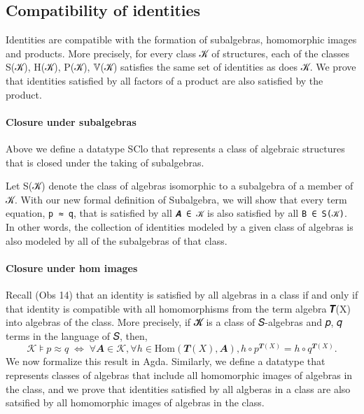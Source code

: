 \documentclass[a4paper,USenglish,cleveref,autoref,thm-restate]{lipics-v2019}
\begin{document}
\subsection{Compatibility of identities}\label{compatibility-of-identities}
Identities are compatible with the formation of subalgebras, homomorphic images and products. More precisely, for every class 𝒦 of structures, each of the classes S(𝒦), H(𝒦), P(𝒦), 𝕍(𝒦) satisfies the same set of identities as does 𝒦. We prove that identities satisfied by all factors of a product are also satisfied by the product.
\begin{code}\end{code}

\paragraph*{Closure under subalgebras}
Above we define a datatype SClo that represents a class of algebraic structures that is closed under the taking of subalgebras.

Let S(𝒦) denote the class of algebras isomorphic to a subalgebra of a member of 𝒦. With our new formal definition of Subalgebra, we will show that every term equation, \texttt{p\ ≈\ q}, that is satisfied by all \texttt{𝑨\ ∈\ 𝒦} is also satisfied by all \texttt{B\ ∈\ S(𝒦)}. In other words, the collection of identities modeled by a given class of algebras is also modeled by all of the subalgebras of that class.
\begin{code}\end{code}

\paragraph*{Closure under hom images}
Recall (Obs 14) that an identity is satisfied by all algebras in a class if and only if that identity is compatible with all homomorphisms from the term algebra 𝑻(X) into algebras of the class. More precisely, if 𝓚 is a class of 𝑆-algebras and 𝑝, 𝑞 terms in the language of 𝑆, then,
\[𝒦 ⊧ p ≈ q \; ⇔ \; ∀ 𝑨 ∈ 𝒦, ∀ h ∈ \mathrm{Hom}(𝑻(X), 𝑨), h ∘ p^{𝑻(X)} = h ∘ q^{𝑻(X)}.\]
We now formalize this result in Agda. Similarly, we define a datatype that represents classes of algebras that include all homomorphic images of algebras in the class, and we prove that identities satisfied by all algberas in a class are also satsified by all homomorphic images of algebras in the class.
\begin{code}\end{code}
\end{document}
